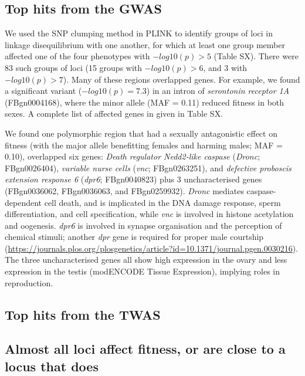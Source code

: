 \documentclass{article}
\begin{document}
\subsection*{Top hits from the GWAS}

We used the SNP clumping method in PLINK to identify groups of loci in
linkage disequilibrium with one another, for which at least one group
member affected one of the four phenotypes with \(-log10(p) > 5\) (Table
SX). There were 83 such groups of loci (15 groups with
\(-log10(p) > 6\), and 3 with \(-log10(p) > 7\)). Many of these regions
overlapped genes. For example, we found a significant variant
(\(-log10(p) = 7.3\)) in an intron of \emph{serontonin receptor 1A}
(FBgn0004168), where the minor allele (MAF = 0.11) reduced fitness in
both sexes. A complete list of affected genes in given in Table SX.

We found one polymorphic region that had a sexually antagonistic effect
on fitness (with the major allele benefitting females and harming males;
MAF = 0.10), overlapped six genes: \emph{Death regulator Nedd2-like
caspase} (\emph{Dronc}; FBgn0026404), \emph{variable nurse cells}
(\emph{vnc}; FBgn0263251), and \emph{defective proboscis extension
response 6} (\emph{dpr6}; FBgn0040823) plus 3 uncharacterised genes
(FBgn0036062, FBgn0036063, and FBgn0259932). \emph{Dronc} mediates
caspase-dependent cell death, and is implicated in the DNA damage
response, sperm differentiation, and cell specification, while
\emph{vnc} is involved in histone acetylation and oogenesis. \emph{dpr6}
is involved in synapse organisation and the perception of chemical
stimuli; another \emph{dpr} gene is required for proper male courtship
(\url{https://journals.plos.org/plosgenetics/article?id=10.1371/journal.pgen.0030216}).
The three uncharacterised genes all show high expression in the ovary
and less expression in the testis (modENCODE Tissue Expression),
implying roles in reproduction.

\subsection*{Top hits from the TWAS}

\subsection*{Almost all loci affect fitness, or are close to a locus that does}
\end{document}
